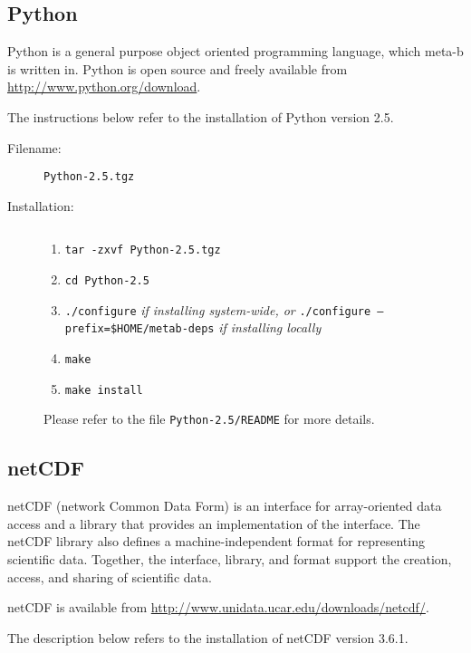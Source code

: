 \subsection{Python}

Python is a general purpose object oriented programming language, which
meta-b is written in.  Python is open source and freely available
from \url{http://www.python.org/download}.

The instructions below refer to the installation of Python version
2.5.

\begin{description}
\item [Filename:] {\tt Python-2.5.tgz}
\item [Installation:] $ $
  \begin{enumerate}
  \item {\tt tar -zxvf Python-2.5.tgz}
  \item {\tt cd Python-2.5}
  \item {\tt ./configure} {\it if installing system-wide, or}\newline
        {\tt ./configure --prefix=\$HOME/metab-deps} {\it if installing locally}
  \item {\tt make}
  \item {\tt make install}
  \end{enumerate}
Please refer to the file {\tt Python-2.5/README} for more details.
\end{description}

\subsection{netCDF}

netCDF (network Common Data Form) is an interface for array-oriented
data access and a library that provides an implementation of the
interface. The netCDF library also defines a machine-independent
format for representing scientific data. Together, the interface,
library, and format support the creation, access, and sharing of
scientific data.

netCDF is available from \url{http://www.unidata.ucar.edu/downloads/netcdf/}.

The description below refers to the installation of netCDF version
3.6.1.

